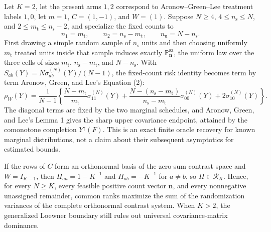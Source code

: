 Let \(K=2\), let the present arms \(1,2\) correspond to Aronow--Green--Lee treatment labels \(1,0\), let \(m=1\), \(C=(1,-1)\), and \(W=(1)\). Suppose \(N\geq4\), \(4\leq n_{\mathrm s}\leq N\), and \(2\leq m_{\mathrm t}\leq n_{\mathrm s}-2\), and specialize the fixed counts to
\[
n_1=m_{\mathrm t},\qquad n_2=n_{\mathrm s}-m_{\mathrm t},\qquad n_{\mathrm u}=N-n_{\mathrm s}.
\]
First drawing a simple random sample of \(n_{\mathrm s}\) units and then choosing uniformly \(m_{\mathrm t}\) treated units inside that sample induces exactly \(\mathbb P_{\mathbf n}^{\mathrm{sa}}\), the uniform law over the three cells of sizes \(m_{\mathrm t}\), \(n_{\mathrm s}-m_{\mathrm t}\), and \(N-n_{\mathrm s}\). With \(S_{ab}(Y)=N\sigma_{ab}^{(N)}(Y)/(N-1)\), the fixed-count risk identity becomes term by term Aronow, Green, and Lee's Equation (2):
\[
\rho_W(Y)=\frac1{N-1}\left\{
\frac{N-m_{\mathrm t}}{m_{\mathrm t}}\sigma_{11}^{(N)}(Y)
+\frac{N-(n_{\mathrm s}-m_{\mathrm t})}{n_{\mathrm s}-m_{\mathrm t}}\sigma_{00}^{(N)}(Y)
+2\sigma_{10}^{(N)}(Y)
\right\}.
\]
The diagonal terms are fixed by the two marginal schedules, and Aronow, Green, and Lee's Lemma 1 gives the sharp upper covariance endpoint, attained by the comonotone completion \(Y^{\uparrow}(F)\). This is an exact finite oracle recovery for known marginal distributions, not a claim about their subsequent asymptotics for estimated bounds.

If the rows of \(C\) form an orthonormal basis of the zero-sum contrast space and \(W=I_{K-1}\), then \(H_{aa}=1-K^{-1}\) and \(H_{ab}=-K^{-1}\) for \(a\ne b\), so \(H\in\mathcal R_K\). Hence, for every \(N\geq K\), every feasible positive count vector \(\mathbf n\), and every nonnegative unassigned remainder, common ranks maximize the sum of the randomization variances of the complete orthonormal contrast system. When \(K>2\), the generalized Loewner boundary still rules out universal covariance-matrix dominance.

